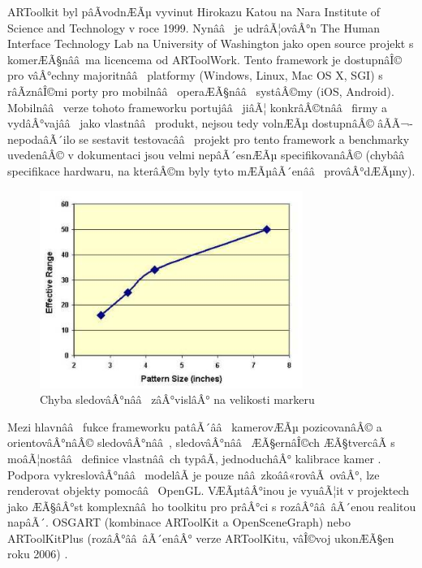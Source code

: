 \documentclass[twoside,12pt]{article}
\begin{document}

ARToolkit byl pâÃvodnÆÃµ vyvinut Hirokazu Katou na Nara Institute of Science and Technology v roce 1999. Nynââ  je udrâÃ¦ovâÂ°n The Human Interface Technology Lab na University of Washington jako open source projekt s komerÆÃ§nââ ma licencema od ARToolWork. Tento framework je dostupnâÎ© pro vâÂ°echny majoritnââ  platformy (Windows, Linux, Mac OS X, SGI) s râÃznâÎ©mi porty pro mobilnââ  operaÆÃ§nââ  systâÂ©my (iOS, Android). Mobilnââ  verze tohoto frameworku portujââ  jiâÃ¦ konkrâÂ©tnââ  firmy a vydâÂ°vajââ  jako vlastnââ  produkt, nejsou tedy volnÆÃµ dostupnâÂ© âÃÃ¬- nepodaâÃ´ilo se sestavit testovacââ  projekt pro tento framework a benchmarky uvedenâÂ© v dokumentaci jsou velmi nepâÃ´esnÆÃµ specifikovanâÂ© (chybââ  specifikace hardwaru, na kterâÂ©m byly tyto mÆÃµâÃ´enââ  provâÂ°dÆÃµny). 

\begin{figure}[H]
    \includegraphics[width=324px, center]{images/artoolkit_benchmark.jpg}
    \caption{Chyba sledovâÂ°nââ  zâÂ°vislâÂ° na velikosti markeru}
    \label{artoolkit_benchmark}
\end{figure}

Mezi hlavnââ  fukce frameworku patâÃ´ââ  kamerovÆÃµ pozicovanâÂ© a orientovâÂ°nâÂ© sledovâÂ°nââ , sledovâÂ°nââ  ÆÃ§ernâÎ©ch ÆÃ§tvercâÃ s moâÃ¦nostââ  definice vlastnââ ch typâÃ, jednoduchâÂ° kalibrace kamer \cite{artoolkit_features}. Podpora vykreslovâÂ°nââ  modelâÃ je pouze nââ zkoââ«rovâÃ ovâÂ°, lze renderovat objekty pomocââ  OpenGL. VÆÃµtâÂ°inou je vyuâÃ¦it v projektech jako ÆÃ§âÂ°st komplexnââ ho toolkitu pro prâÂ°ci s rozâÂ°ââ âÃ´enou realitou napâÃ´. OSGART (kombinace ARToolKit a OpenSceneGraph) \cite{osgart} nebo ARToolKitPlus (rozâÂ°ââ âÃ´enâÂ° verze ARToolKitu, vâÎ©voj ukonÆÃ§en roku 2006) \cite{wagner_schmalstieg}. 
\end{document}
